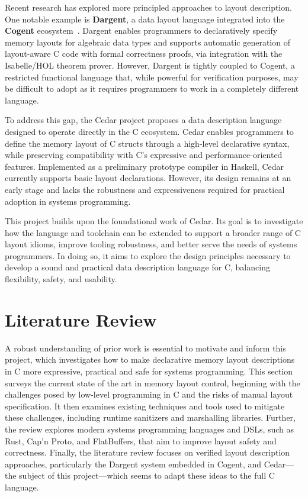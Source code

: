\documentclass[12pt]{article}
\begin{document}
Recent research has explored more principled approaches to layout description.
One notable example is \textbf{Dargent}, a data layout
language integrated into the \textbf{Cogent} ecosystem~\autocite{dargent}. Dargent enables programmers
to declaratively specify memory layouts for algebraic data types and
supports automatic generation of layout-aware C code with formal correctness
proofs, via integration with the Isabelle/HOL theorem prover. However, 
Dargent is tightly coupled to Cogent, a restricted functional language that,
while powerful for verification purposes, may be difficult to adopt
as it requires programmers to work in a completely different language.

To address this gap, the Cedar project proposes a
data description language designed to operate directly in the C ecosystem.
Cedar enables programmers to define the memory
layout of C structs through a high-level
declarative syntax, while preserving compatibility with C's expressive and 
performance-oriented features. Implemented as a preliminary prototype compiler in  Haskell,
Cedar currently supports basic layout declarations. However, its design remains
at an early stage and lacks the robustness and expressiveness required for
practical adoption in systems programming.

This project builds upon the foundational work of Cedar. Its goal is to 
investigate how the language and toolchain can be extended to support a 
broader range of C layout idioms, improve tooling robustness, and better
serve the needs of systems programmers. In doing so, it aims to explore the
design principles necessary to develop a sound and practical data description
language for C, balancing flexibility, safety, and usability.

\section{Literature Review}
A robust understanding of prior work is essential to motivate and inform
this project, which investigates how to make declarative memory layout
descriptions in C more expressive, practical and safe for systems programming.
This section surveys the current state of the art in memory layout
control, beginning with the challenges posed by low-level programming in C
and the risks of manual layout specification. It then examines existing
techniques and tools used to mitigate these challenges, including runtime
sanitizers and marshalling libraries. Further, the review explores modern systems
programming languages and DSLs, such as Rust, Cap'n Proto, and FlatBuffers, that
aim to improve layout safety and correctness. Finally, the literature review focuses 
on verified layout description approaches, particularly the Dargent system
embedded in Cogent, and Cedar---the subject of this project---which seems to
adapt these ideas to the full C language.
\end{document}
